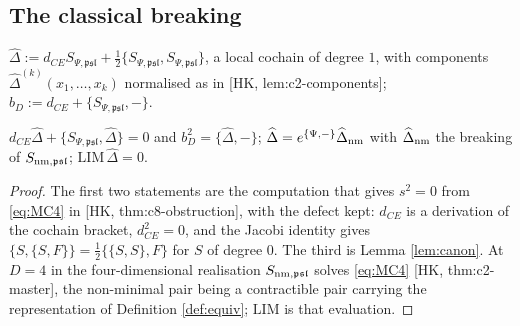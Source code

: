 \subsection{The classical breaking}

\begin{definition}
\label{def:breaking}
$\widehat\Delta:=d_{CE}S_{\Psi,\mathfrak{psl}}+\frac12\{S_{\Psi,\mathfrak{psl}},S_{\Psi,\mathfrak{psl}}\}$, a local cochain of degree $1$, with components $\widehat\Delta^{(k)}(x_1,\dots,x_k)$ normalised as in [HK, lem:c2-components]; $b_D:=d_{CE}+\{S_{\Psi,\mathfrak{psl}},-\}$.
\end{definition}

\begin{lemma}
\label{lem:bianchi}
$d_{CE}\widehat\Delta+\{S_{\Psi,\mathfrak{psl}},\widehat\Delta\}=0$ and $b_D^2=\{\widehat\Delta,-\}$; $\widehat\Delta=e^{\{\Psi,-\}}\widehat\Delta_{\rm nm}$ with $\widehat\Delta_{\rm nm}$ the breaking of $S_{{\rm nm},\mathfrak{psl}}$; $\mathrm{LIM}\,\widehat\Delta=0$.
\end{lemma}

\begin{proof}
The first two statements are the computation that gives $s^2=0$ from \eqref{eq:MC4} in [HK, thm:c8-obstruction], with the defect kept: $d_{CE}$ is a derivation of the cochain bracket, $d_{CE}^2=0$, and the Jacobi identity gives $\{S,\{S,F\}\}=\frac12\{\{S,S\},F\}$ for $S$ of degree $0$. The third is Lemma \ref{lem:canon}. At $D=4$ in the four-dimensional realisation $S_{{\rm nm},\mathfrak{psl}}$ solves \eqref{eq:MC4} [HK, thm:c2-master], the non-minimal pair being a contractible pair carrying the representation of Definition \ref{def:equiv}; $\mathrm{LIM}$ is that evaluation.
\end{proof}

